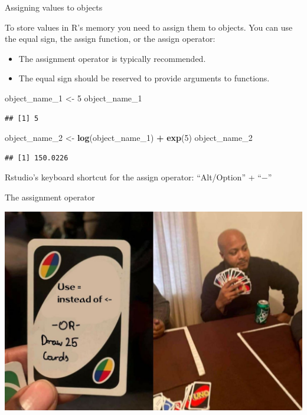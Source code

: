 \documentclass[ignorenonframetext,]{beamer}
\newenvironment{Shaded}{\begin{snugshade}}{\end{snugshade}}
\newcommand{\DecValTok}[1]{\textcolor[rgb]{0.00,0.00,0.81}{#1}}
\newcommand{\KeywordTok}[1]{\textcolor[rgb]{0.13,0.29,0.53}{\textbf{#1}}}
\newcommand{\NormalTok}[1]{#1}
\newcommand{\OperatorTok}[1]{\textcolor[rgb]{0.81,0.36,0.00}{\textbf{#1}}}
\newcommand{\StringTok}[1]{\textcolor[rgb]{0.31,0.60,0.02}{#1}}
\providecommand{\tightlist}{%
  \setlength{\itemsep}{0pt}\setlength{\parskip}{0pt}}
\begin{document}
\begin{frame}[fragile]{Assigning values to objects}
\protect\hypertarget{assigning-values-to-objects}{}

To store values in R's memory you need to assign them to objects. You
can use the equal sign, the assign function, or the assign operator:

\begin{itemize}
\tightlist
\item
  The assignment operator is typically recommended.
\item
  The equal sign should be reserved to provide arguments to functions.
\end{itemize}

\begin{Shaded}
\begin{Highlighting}[]
\NormalTok{object_name_}\DecValTok{1}\NormalTok{ <-}\StringTok{ }\DecValTok{5}
\NormalTok{object_name_}\DecValTok{1}
\end{Highlighting}
\end{Shaded}

\begin{verbatim}
## [1] 5
\end{verbatim}

\begin{Shaded}
\begin{Highlighting}[]
\NormalTok{object_name_}\DecValTok{2}\NormalTok{ <-}\StringTok{ }\KeywordTok{log}\NormalTok{(object_name_}\DecValTok{1}\NormalTok{) }\OperatorTok{+}\StringTok{ }\KeywordTok{exp}\NormalTok{(}\DecValTok{5}\NormalTok{)}
\NormalTok{object_name_}\DecValTok{2}
\end{Highlighting}
\end{Shaded}

\begin{verbatim}
## [1] 150.0226
\end{verbatim}

Rstudio's keyboard shortcut for the assign operator: ``Alt/Option'' +
``\(-\)''

\end{frame}

\begin{frame}{The assignment operator}
\protect\hypertarget{the-assignment-operator}{}

\includegraphics[scale=.22]{figures/meme.jpg}

\end{frame}
\end{document}
